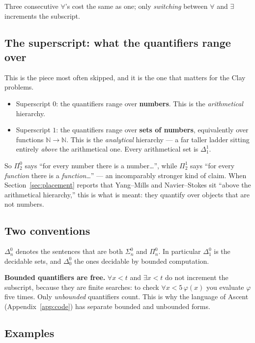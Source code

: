 \documentclass[11pt,a4paper]{article}
\newcommand{\Sig}[2]{\Sigma^{#1}_{#2}}
\newcommand{\Pai}[2]{\Pi^{#1}_{#2}}
\newcommand{\Del}[2]{\Delta^{#1}_{#2}}
\begin{document}
Three consecutive $\forall$'s cost the same as one; only \emph{switching}
between $\forall$ and $\exists$ increments the subscript.

\subsection*{The superscript: what the quantifiers range over}

This is the piece most often skipped, and it is the one that matters for the
Clay problems.

\begin{itemize}
\item Superscript $0$: the quantifiers range over \textbf{numbers}. This is
the \emph{arithmetical} hierarchy.
\item Superscript $1$: the quantifiers range over \textbf{sets of numbers},
equivalently over functions $\mathbb{N} \to \mathbb{N}$. This is the
\emph{analytical} hierarchy --- a far taller ladder sitting entirely
\emph{above} the arithmetical one. Every arithmetical set is $\Del{1}{1}$.
\end{itemize}

So $\Pai{0}{2}$ says ``for every number there is a number\ldots'', while
$\Pai{1}{2}$ says ``for every \emph{function} there is a \emph{function}\ldots''
--- an incomparably stronger kind of claim. When
Section~\ref{sec:placement} reports that Yang--Mills and Navier--Stokes sit
``above the arithmetical hierarchy,'' this is what is meant: they quantify
over objects that are not numbers.

\subsection*{Two conventions}

$\Del{0}{n}$ denotes the sentences that are both $\Sig{0}{n}$ and
$\Pai{0}{n}$. In particular $\Del{0}{1}$ is the decidable sets, and
$\Del{0}{0}$ the ones decidable by bounded computation.

\textbf{Bounded quantifiers are free.} $\forall x < t$ and $\exists x < t$ do
not increment the subscript, because they are finite searches: to check
$\forall x < 5\, \varphi(x)$ you evaluate $\varphi$ five times. Only
\emph{unbounded} quantifiers count. This is why the language of Ascent
(Appendix~\ref{app:code}) has separate bounded and unbounded forms.

\subsection*{Examples}
\end{document}
